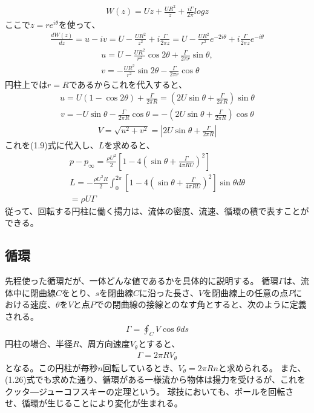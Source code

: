 \documentclass[10pt,b5paper,papersize,dvipdfmx]{jsbook}
\begin{document}
\begin{align}
  W(z) = Uz + \frac{UR^2}{z} + \frac{i\Gamma}{2\pi}log z
\end{align}
ここで$z=re^{i\theta}$を使って、
\begin{align}
  \frac{dW(z)}{dz} = u - iv = U - \frac{UR^2}{z^2} + i\frac{\Gamma}{2\pi z} = U - \frac{UR^2}{r^2}e^{-2i\theta} + i\frac{\Gamma}{2\pi z}e^{-i\theta}
\end{align}
\begin{align}
  u = U - \frac{UR^2}{r^2}\cos 2\theta + \frac{\Gamma}{2\pi r}\sin\theta ,\\
  v = -\frac{UR^2}{r^2}\sin 2\theta - \frac{\Gamma}{2\pi r}\cos\theta
\end{align}
円柱上では$r=R$であるからこれを代入すると、
\begin{align}
  u = U(1 - \cos 2\theta) + \frac{\Gamma}{2\pi R} = (2U\sin\theta + \frac{\Gamma}{2\pi R})\sin\theta
\end{align}
\begin{align}
  v = -U\sin\theta - \frac{\Gamma}{2\pi R}\cos\theta = -(2U\sin\theta + \frac{\Gamma}{2\pi R})\cos\theta
\end{align}
\begin{align}
  V = \sqrt{u^2 + v^2} = |2U\sin\theta + \frac{\Gamma}{2\pi R}|
\end{align}
これを(1.9)式に代入し、$L$を求めると、
\begin{align}
  p - p_\infty = \frac{\rho U^2}{2}[1 - 4(\sin\theta + \frac{\Gamma}{4\pi RU})^2]\\
  L = -\frac{\rho U^2R}{2}\int_0^{2\pi} [1 -4(\sin\theta + \frac{\Gamma}{4\pi RU})^2]\sin\theta d\theta \\
    = \rho U\Gamma
\end{align}
従って、回転する円柱に働く揚力は、流体の密度、流速、循環の積で表すことができる。
\subsection{循環}
先程使った循環だが、一体どんな値であるかを具体的に説明する。
循環$\Gamma$は、流体中に閉曲線$C$をとり、$s$を閉曲線$C$に沿った長さ、$V$を閉曲線上の任意の点$P$における速度、$\theta$を$V$と点$P$での閉曲線の接線とのなす角とすると、次のように定義される。
\begin{align}
  \Gamma = \oint_C V\cos\theta ds
\end{align}
円柱の場合、半径$R$、周方向速度$V_\theta$とすると、
\begin{align}
  \Gamma = 2\pi RV_\theta
\end{align}
となる。この円柱が毎秒$n$回転しているとき、$V_\theta = 2\pi Rn$と求められる。
また、(1.26)式でも求めた通り、循環がある一様流から物体は揚力を受けるが、これをクッタ―ジューコフスキーの定理という。
球技においても、ボールを回転させ、循環が生じることにより変化が生まれる。
\end{document}
